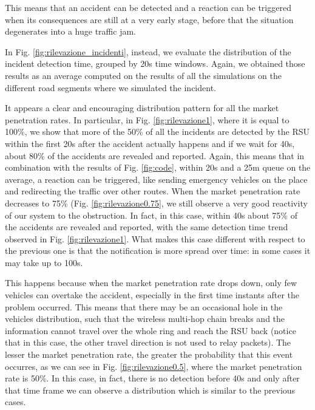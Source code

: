 \documentclass[conference]{IEEEtran}
\begin{document}
This means that an accident can be detected and a reaction can be triggered when its consequences are still at a very early stage, before that the situation degenerates into a huge traffic jam.

In Fig. \ref{fig:rilevazione_incidenti}, instead, we evaluate the distribution of the incident detection time, grouped by 20s time windows. Again, we obtained those results as an average computed on the results of all the simulations on the different road segments where we simulated the incident.

It appears a clear and encouraging distribution pattern for all the market penetration rates. In particular, in Fig. \ref{fig:rilevazione1}, where it is equal to 100\%, we show that more of the 50\% of all the incidents are detected by the RSU within the first 20s after the accident actually happens and if we wait for 40s, about 80\% of the accidents are revealed and reported. Again, this means that in combination with the results of Fig. \ref{fig:code}, within 20s and a 25m queue on the average, a reaction can be triggered, like sending  emergency vehicles on the place and redirecting the traffic over other routes.
When the market penetration rate decreases to 75\% (Fig. \ref{fig:rilevazione0.75}, we still observe a very good reactivity of our system to the obstruction. In fact, in this case, within 40s about 75\% of the accidents are revealed and reported, with the same detection time trend observed in Fig. \ref{fig:rilevazione1}. What makes this case different with respect to the previous one is that the notification is more spread over time: in some cases it may take up to 100s.

This happens because when the market penetration rate drops down, only few vehicles can overtake the accident, especially in the first time instants after the problem occurred. This means that there may be an occasional hole in the vehicles distribution, such that the wireless multi-hop chain breaks and the information cannot travel over the whole ring and reach the RSU back (notice that in this case, the other travel direction is not used to relay packets).
The lesser the market penetration rate, the greater the probability that this event occurres, as we can see in Fig. \ref{fig:rilevazione0.5}, where the market penetration rate is 50\%. In this case, in fact, there is no detection before 40s and only after that time frame we can observe a distribution which is similar to the previous cases.
\end{document}
